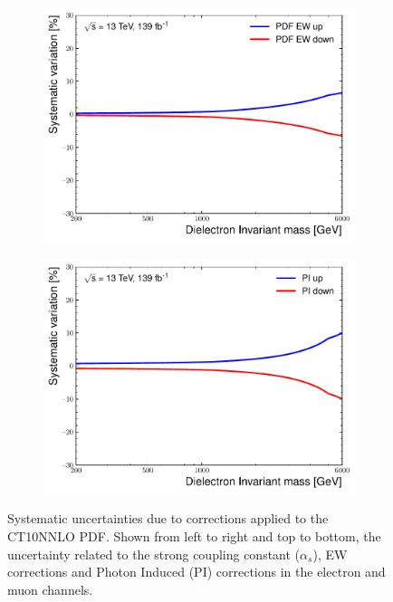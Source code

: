 \begin{figure}[h!]
\begin{subfigure}[h]{0.42\textwidth}
        \includegraphics[width=\textwidth]{figures/analysis/datamc/Uncertainties/theory/ee/backgroundTemplate_KF_PDF_EW__1up.pdf}
        \label{fig:uncert:eeEW}
    \end{subfigure}
    \begin{subfigure}[h]{0.42\textwidth}
        \centering
        \includegraphics[width=\textwidth]{figures/analysis/datamc/Uncertainties/theory/ee/backgroundTemplate_KF_PI__1up.pdf}
        \label{fig:uncert:eePI}
    \end{subfigure}
    \caption{Systematic uncertainties due to corrections applied to the CT10NNLO PDF. Shown from left to right and top to bottom, the uncertainty related to the strong coupling constant ($\alpha_s$), EW corrections and Photon Induced (PI) corrections in the electron and muon channels.}
    \label{fig:uncert:theoryConstants}
\end{figure}

\clearpage